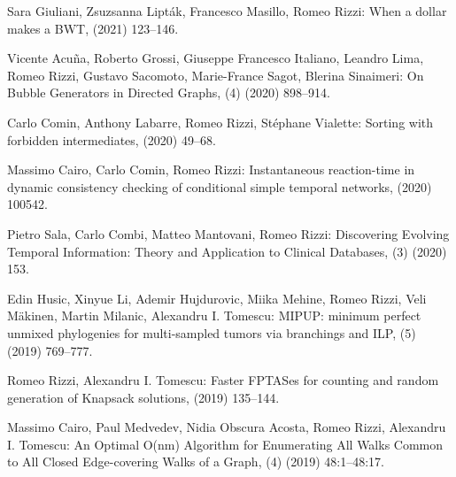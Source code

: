\begin{etaremune}
  \item {\sc Sara Giuliani, Zsuzsanna Lipták, Francesco Masillo, Romeo Rizzi:}
   \newblock When a dollar makes a BWT,
    (2021) 123--146.

  \item {\sc Vicente Acuña, Roberto Grossi, Giuseppe Francesco Italiano, Leandro Lima, Romeo Rizzi, Gustavo Sacomoto, Marie-France Sagot, Blerina Sinaimeri:}
   \newblock On Bubble Generators in Directed Graphs,
   (4) (2020) 898--914.

  \item {\sc Carlo Comin, Anthony Labarre, Romeo Rizzi, Stéphane Vialette:}
   \newblock Sorting with forbidden intermediates,
    (2020) 49--68.

  \item {\sc Massimo Cairo, Carlo Comin, Romeo Rizzi:}
   \newblock Instantaneous reaction-time in dynamic consistency checking of conditional simple temporal networks,
    (2020) 100542.

  \item {\sc Pietro Sala, Carlo Combi, Matteo Mantovani, Romeo Rizzi:}
   \newblock Discovering Evolving Temporal Information: Theory and Application to Clinical Databases,
   (3) (2020) 153.

  \item {\sc Edin Husic, Xinyue Li, Ademir Hujdurovic, Miika Mehine, Romeo Rizzi, Veli Mäkinen, Martin Milanic, Alexandru I. Tomescu:}
   \newblock MIPUP: minimum perfect unmixed phylogenies for multi-sampled tumors via branchings and ILP,
   (5) (2019) 769--777.

  \item {\sc Romeo Rizzi, Alexandru I. Tomescu:}
   \newblock Faster FPTASes for counting and random generation of Knapsack solutions,
    (2019) 135--144.

  \item {\sc Massimo Cairo, Paul Medvedev, Nidia Obscura Acosta, Romeo Rizzi, Alexandru I. Tomescu:}
   \newblock An Optimal O(nm) Algorithm for Enumerating All Walks Common to All Closed Edge-covering Walks of a Graph,
   (4) (2019) 48:1--48:17.


\end{etaremune}
